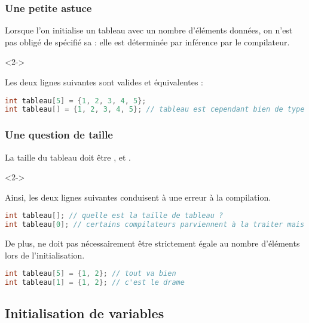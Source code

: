 \documentclass{cppcourses}
\begin{document}
\begin{frame}[fragile]

\frametitle{Une petite astuce}

Lorsque l'on initialise un tableau avec un nombre d'éléments données, on n'est pas obligé de spécifié sa \mykeyword{\textcolor{teal}{taille}} : elle est déterminée par inférence par le compilateur.

\begin{example}<2->

Les deux lignes suivantes sont valides et équivalentes :

\begin{lstlisting}[language = c++]
int tableau[5] = {1, 2, 3, 4, 5};
int tableau[] = {1, 2, 3, 4, 5}; // tableau est cependant bien de type int[5]
\end{lstlisting}

\end{example}

\end{frame}

\begin{frame}[fragile]

\frametitle{Une question de taille}

La taille du tableau doit être ,  et .

\begin{example}<2->

Ainsi, les deux lignes suivantes conduisent à une erreur à la compilation.

\begin{lstlisting}[language = c++]
int tableau[]; // quelle est la taille de tableau ?
int tableau[0]; // certains compilateurs parviennent à la traiter mais ce comportement n'est pas standard
\end{lstlisting}

De plus, \mykeyword{\textcolor{teal}{taille}} ne doit pas nécessairement être strictement égale au nombre d'éléments lors de l'initialisation.

\begin{lstlisting}[language = c++]
int tableau[5] = {1, 2}; // tout va bien
int tableau[1] = {1, 2}; // c'est le drame
\end{lstlisting}

\end{example}

\end{frame}

\subsection{Initialisation de variables}
\end{document}
